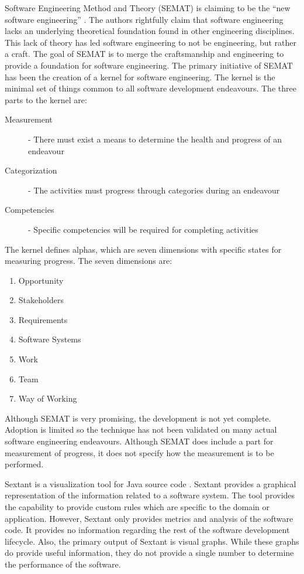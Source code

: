 \documentclass[SDSUThesis.tex]{subfiles}
\begin{document}
    Software Engineering Method and Theory (SEMAT) is claiming to be the ``new software engineering'' 
    \cite{Jacobson2014}.  The authors rightfully claim that software engineering lacks
    an underlying theoretical foundation found in other engineering disciplines.  This lack of theory
    has led software engineering to not be engineering, but rather a craft.  The goal of 
    SEMAT is to merge the craftsmanship and engineering to provide a foundation for software
    engineering.  The primary initiative of SEMAT has been the creation of a kernel for 
    software engineering.  The kernel is the minimal set of things common to all software development
    endeavours. The three parts to the kernel are:
    \begin{description}
        \item[Measurement] - There must exist a means to determine the health and progress of an endeavour
        \item[Categorization]-  The activities must progress through categories during an endeavour
        \item[Competencies] - Specific competencies will be required for completing activities
    \end{description}
    The kernel defines alphas, which are seven dimensions with
    specific states for measuring progress. 
    The seven dimensions are: 
    \begin{enumerate}
        \item Opportunity
        \item Stakeholders
        \item Requirements
        \item Software Systems
        \item Work
        \item Team
        \item Way of Working
    \end{enumerate}
    
    Although SEMAT is very promising, the development is not yet complete.  Adoption is
    limited so the technique has not been validated on many
    actual software engineering endeavours.  Although SEMAT does include a part for
    measurement of progress, it does not specify how the measurement is to be 
    performed.



Sextant is a visualization tool for Java source code \cite{Winter2013}.  Sextant provides a graphical representation of the information related 
to a software system.  The tool provides the capability to provide custom rules which are specific to the domain or application.  However,
Sextant only provides metrics and analysis of the software code.  It provides no information regarding the rest of the 
software development lifecycle.  Also, the primary output of Sextant is visual graphs.  While these graphs do provide
useful information, they do not provide a single number to determine the performance of the software.
\end{document}
